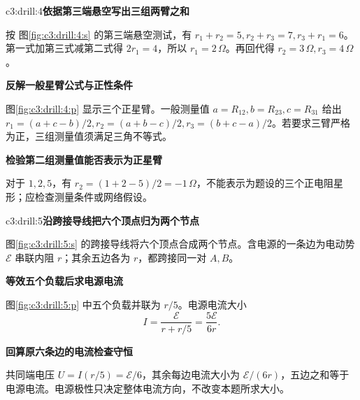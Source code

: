 \begin{drillsolution}{c3:drill:4}\textbf{依据第三端悬空写出三组两臂之和}\par\nobreak
按 图\ref{fig:c3:drill:4:s} 的第三端悬空测试，有 $r_1+r_2=5,r_2+r_3=7,r_3+r_1=6$。第一式加第三式减第二式得 $2r_1=4$，所以 $r_1=2\,\Omega$。再回代得 $r_2=3\,\Omega,r_3=4\,\Omega$。



\par\medskip{}\noindent\textbf{反解一般星臂公式与正性条件}\par\nobreak
图\ref{fig:c3:drill:4:p} 显示三个正星臂。一般测量值 $a=R_{12},b=R_{23},c=R_{31}$ 给出 $r_1=(a+c-b)/2,r_2=(a+b-c)/2,r_3=(b+c-a)/2$。若要求三臂严格为正，三组测量值须满足三角不等式。

\par\medskip{}\noindent\textbf{检验第二组测量值能否表示为正星臂}\par\nobreak
对于 $1,2,5$，有 $r_2=(1+2-5)/2=-1\,\Omega$，不能表示为题设的三个正电阻星形；应检查测量条件或网络假设。\end{drillsolution}
\begin{drillsolution}{c3:drill:5}\textbf{沿跨接导线把六个顶点归为两个节点}\par\nobreak
图\ref{fig:c3:drill:5:s} 的跨接导线将六个顶点合成两个节点。含电源的一条边为电动势 $\mathcal E$ 串联内阻 $r$；其余五边各为 $r$，都跨接同一对 $A,B$。



\par\medskip{}\noindent\textbf{等效五个负载后求电源电流}\par\nobreak
图\ref{fig:c3:drill:5:p} 中五个负载并联为 $r/5$。电源电流大小
\[
 I=\frac{\mathcal E}{r+r/5}=\frac{5\mathcal E}{6r}.
\]


\par\medskip{}\noindent\textbf{回算原六条边的电流检查守恒}\par\nobreak
共同端电压 $U=I(r/5)=\mathcal E/6$，其余每边电流大小为 $\mathcal E/(6r)$，五边之和等于电源电流。电源极性只决定整体电流方向，不改变本题所求大小。\end{drillsolution}
